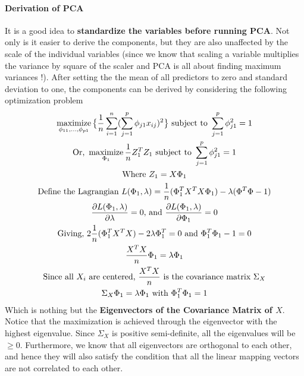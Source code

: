 \documentclass[../statistical_learning_notes.tex]{subfiles}
\begin{document}
    \paragraph{Derivation of PCA}
    It is a good idea to \textbf{standardize the variables before running PCA}. Not only is it easier to derive the components, but they are also unaffected by the scale of the individual variables (since we know that scaling a variable multiplies the variance by square of the scaler and PCA is all about finding maximum variances !). \newline \newline
    After setting the the mean of all predictors to zero and standard deviation to one, the components can be derived by considering the following optimization problem
    \begin{gather*}
        \operatorname*{maximize}_{\phi_{11},\ldots,\phi_{p1}} \big\{ \frac{1}{n} \sum_{i=1}^{n} (\sum_{j=1}^{p}\phi_{j1}x_{ij})^{2} \big\} \text{ subject to } \sum_{j=1}^{p} \phi_{j1}^{2} = 1\\
        \text{Or, } \operatorname*{maximize}_{\Phi_{1}} \frac{1}{n} Z_{1}^{T}Z_{1} \text{ subject to } \sum_{j=1}^{p} \phi_{j1}^{2} = 1\\
        \text{Where } Z_{1} = X\Phi_{1}\\
        \text{Define the Lagrangian } L(\Phi_{1}, \lambda) = \frac{1}{n} (\Phi_{1}^{T}X^{T}X\Phi_{1}) - \lambda (\Phi^{T}\Phi - 1)\\
        \frac{\partial L(\Phi_{1}, \lambda)}{\partial \lambda} = 0 \text{, and } \frac{\partial L(\Phi_{1}, \lambda)}{\partial \Phi_{1}} = 0 \\
        \text{Giving, } 2\frac{1}{n}(\Phi_{1}^{T}X^{T}X) - 2\lambda \Phi_{1}^{T} = 0 \text{ and } \Phi_{1}^{T}\Phi_{1} - 1 = 0\\
        \frac{X^{T}X}{n}\Phi_{1} = \lambda \Phi_{1}\\
        \text{Since all } X_{i} \text{ are centered, } \frac{X^{T}X}{n} \text{ is the covariance matrix } \Sigma_{X}\\
        \Sigma_{X} \Phi_{1} = \lambda \Phi_{1} \text{ with } \Phi_{1}^{T}\Phi_{1} = 1\\
    \end{gather*}
    Which is nothing but the \textbf{Eigenvectors of the Covariance Matrix of $X$}. Notice that the maximization is achieved through the eigenvector with the highest eigenvalue. Since $\Sigma_{X}$ is positive semi-definite, all the eigenvalues will be $\geq 0$. \newline
    Furthermore, we know that all eigenvectors are orthogonal to each other, and hence they will also satisfy the condition that all the linear mapping vectors are not correlated to each other. \newline
\end{document}
